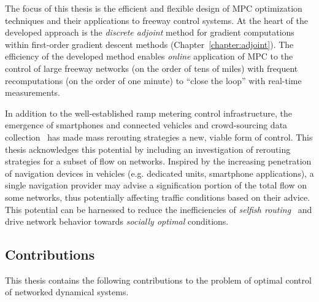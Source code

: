 The focus of this thesis is the efficient and flexible design of MPC optimization techniques and their applications to freeway control systems. At the heart of the developed approach is the \emph{discrete adjoint} method for gradient computations within first-order gradient descent methods (Chapter~\ref{chapter:adjoint}). The efficiency of the developed method enables \emph{online} application of MPC to the control of large freeway networks (on the order of tens of miles) with frequent recomputations (on the order of one minute) to ``close the loop'' with real-time measurements.

In addition to the well-established ramp metering control infrastructure, the emergence of smartphones and connected vehicles and crowd-sourcing data collection~\cite{Reilly2013,Ervasti2011,dashti2013evaluating} has made mass rerouting strategies a new, viable form of control. This thesis acknowledges this potential by including an investigation of rerouting strategies for a subset of flow on networks. Inspired by the increasing penetration of navigation devices in vehicles (e.g. dedicated units, smartphone applications), a single navigation provider may advise a signification portion of the total flow on some networks, thus potentially affecting traffic conditions based on their advice. This potential can be harnessed to reduce the inefficiencies of \emph{selfish routing}~\cite{roughgarden2002bad,krichenetac} and drive network behavior towards \emph{socially optimal} conditions.

\subsection{Contributions}
\label{sec:contributions}

This thesis contains the following contributions to the problem of optimal control of networked dynamical systems.

